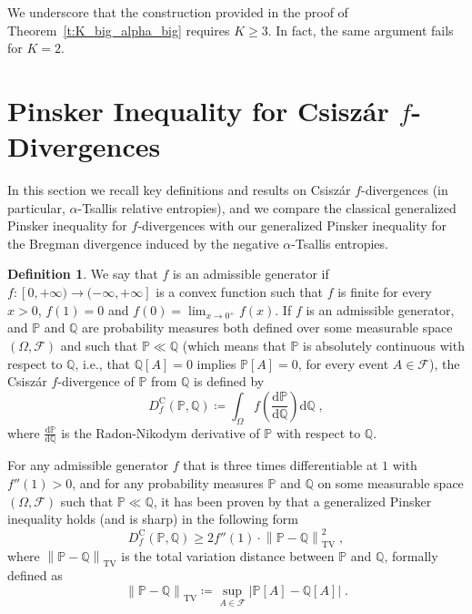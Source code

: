 \documentclass[11pt,oneside,a4paper]{article}
\newcommand{\cF}{\mathcal{F}}
\newcommand{\Pb}{\mathbb{P}}
\newcommand{\Q}{\mathbb{Q}}
\newcommand{\lrb}[1]{\left(#1\right)}
\newcommand{\babs}[1]{\bigl\lvert#1\bigr\rvert}
\newcommand{\lno}[1]{\left\lVert#1\right\rVert}
\newcommand{\dif}{\mathrm{d}}
\theoremstyle{plain}
\theoremstyle{definition}
\newtheorem{definition}[theorem]{Definition}
\theoremstyle{remark}
\newcommand{\TV}[2]{\lno{ #1 - #2 }_{\textrm{TV}} }
\begin{document}
{\renewcommand{\proofname}{Proof}

We underscore that the construction provided in the proof of Theorem~\ref{t:K_big_alpha_big} requires $K \geq 3$. In fact, the same argument fails for $K = 2$.
\section{Pinsker Inequality for Csisz\'ar \texorpdfstring{$f$}{f}-Divergences}
\label{sec:f-divergences}
In this section we recall key definitions and results on Csisz\'ar $f$-divergences (in particular, $\alpha$-Tsallis relative entropies), and we compare the classical generalized Pinsker inequality for $f$-divergences with our generalized Pinsker inequality for the Bregman divergence induced by the negative $\alpha$-Tsallis entropies.

\begin{definition}
We say that $f$ is an admissible generator if $f \colon [0,+\infty) \to (-\infty,+\infty]$ is a convex function such that $f$ is finite for every $x >0$, $f(1)=0$ and $f(0) = \lim_{x \to 0^+}f(x)$.
If $f$ is an admissible generator, and $\Pb$ and $\Q$ are probability measures both defined over some measurable space $(\Omega,\cF)$ and such that $\Pb\ll\Q$ (which means that $\Pb$ is absolutely continuous with respect to $\Q$, i.e., that $\Q[A] = 0$ implies $ \Pb[A]=0$, for every event $A \in \cF$), the Csisz\'ar $f$-divergence of $\Pb$ from $\Q$ is defined by
\[
    D_f^{\textrm{C}}(\Pb,\Q)
\coloneqq
    \int_\Omega f\lrb{\frac{\dif \Pb}{\dif \Q}}\dif \Q\;,
\]
where $\frac{\dif \Pb}{\dif \Q}$ is the Radon-Nikodym derivative of $\Pb$ with respect to $\Q$.
\end{definition}

For any admissible generator $f$ that is three times differentiable at $1$ with $f''(1)>0$, and for any probability measures $\Pb$ and $\Q$ on some measurable space $(\Omega,\cF)$ such that $\Pb\ll\Q$, it has been proven by \cite{Gilardoni} that a generalized Pinsker inequality holds (and is sharp) in the following form
\begin{equation}
\label{eq:Pinsker_Csiszar}
   D_f^{\textrm{C}}(\Pb,\Q)
\ge
    2f''(1) \cdot \TV{\Pb}{\Q}^2\;,
\end{equation}
where $\TV{\Pb}{\Q}$ is the total variation distance between $\Pb$ and $\Q$, formally defined as
\[
    \TV{\Pb}{\Q}
\coloneqq
    \sup_{A \in \cF} \babs{ \Pb[A] - \Q[A]}\;.
\]

}
\end{document}
